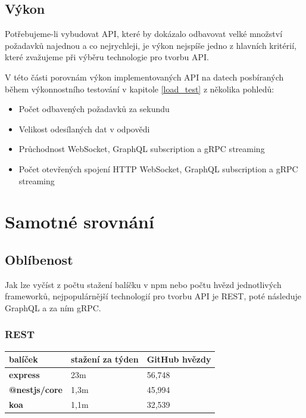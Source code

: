 \documentclass[thesis=M,czech]{FITthesis}[2019/12/23]
\begin{document}
\subsection{Výkon}
Potřebujeme-li vybudovat API, které by dokázalo odbavovat velké množství požadavků najednou a co nejrychleji, je výkon nejspíše jedno z hlavních kritérií, které zvažujeme při výběru technologie pro tvorbu API.

V této části porovnám výkon implementovaných API na datech posbíraných během výkonnostního testování v kapitole \ref{load_test} z několika pohledů:

\begin{itemize}
    \item Počet odbavených požadavků za sekundu
    \item Velikost odesílaných dat v odpovědi
    \item Průchodnost WebSocket, GraphQL subscription a gRPC streaming
    \item Počet otevřených spojení HTTP WebSocket, GraphQL subscription a gRPC streaming
\end{itemize}

\section{Samotné srovnání}

\subsection{Oblíbenost}
Jak lze vyčíst z počtu stažení balíčku v npm nebo počtu hvězd jednotlivých frameworků, nejpopulárnější technologií pro tvorbu API je REST, poté následuje GraphQL a za ním gRPC.

\subsubsection*{REST}
\begin{table}[H]
  \begin{tabular}{|l|l|l|}
  \hline
  \textbf{balíček}      & \textbf{stažení za týden} & \textbf{GitHub hvězdy} \\ \hline
  \textbf{express}      & 23m                       & 56,748                 \\ \hline
  \textbf{@nestjs/core} & 1,3m                      & 45,994                 \\ \hline
  \textbf{koa}          & 1,1m                      & 32,539                 \\ \hline
  \end{tabular}
\end{table}
\end{document}
